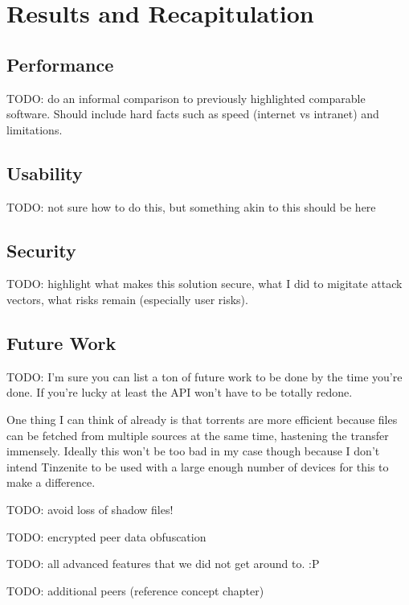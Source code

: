 \chapter{Results and Recapitulation}
\label{chap:results}


\section{Performance}

TODO: do an informal comparison to previously highlighted comparable software.
Should include hard facts such as speed (internet vs intranet) and limitations.

\section{Usability}

TODO: not sure how to do this, but something akin to this should be here

\section{Security}

TODO: highlight what makes this solution secure, what I did to migitate attack vectors, what risks remain (especially user risks).

\section{Future Work}
\label{sec:Future Work}

TODO: I'm sure you can list a ton of future work to be done by the time you're done.
If you're lucky at least the API won't have to be totally redone.

One thing I can think of already is that torrents are more efficient because files can be fetched from multiple sources at the same time, hastening the transfer immensely.
Ideally this won't be too bad in my case though because I don't intend Tinzenite to be used with a large enough number of devices for this to make a difference.

TODO: avoid loss of shadow files!

TODO: encrypted peer data obfuscation

TODO: all advanced features that we did not get around to. :P

TODO: additional peers (reference concept chapter)

